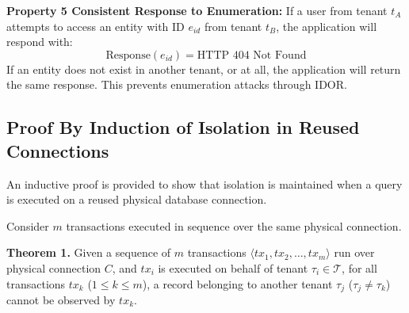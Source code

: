 \documentclass[conference]{IEEEtran}
\begin{document}
\noindent \textbf{Property 5 Consistent Response to Enumeration:} If a user from tenant $t_A$ attempts to access an entity with ID $e_{\mathit{id}}$ from tenant $t_B$, the application will respond with:
\begin{equation}
\text{Response}(e_{\mathit{id}}) = \text{HTTP 404 Not Found}
\end{equation}
If an entity does not exist in another tenant, or at all, the application will return the same response. This prevents enumeration attacks through IDOR.

\begin{table}[t]
\renewcommand{\arraystretch}{0.95}
\caption{Formal Property-to-Evidence Verification Mapping}
\label{tab:property_mapping}
\centering
\scriptsize
\setlength{\tabcolsep}{3pt}
\end{table}

\subsection{Proof By Induction of Isolation in Reused Connections}
An inductive proof is provided to show that isolation is maintained when a query is executed on a reused physical database connection.

Consider $m$ transactions executed in sequence over the same physical connection.

\noindent \textbf{Theorem 1.} Given a sequence of $m$ transactions $\langle tx_1, tx_2, \dots, tx_m \rangle$ run over physical connection $C$, and $tx_i$ is executed on behalf of tenant $\tau_i \in \mathcal{T}$, for all transactions $tx_k$ ($1 \le k \le m$), a record belonging to another tenant $\tau_j$ ($\tau_j \neq \tau_k$) cannot be observed by $tx_k$.
\end{document}

